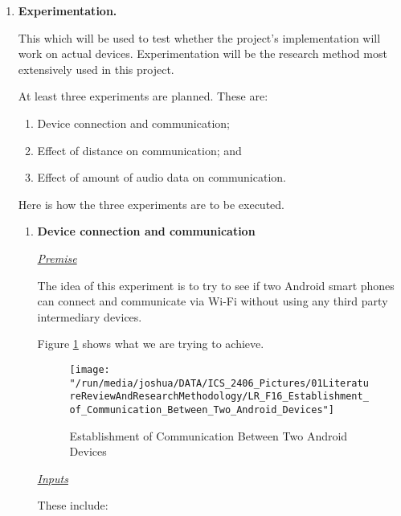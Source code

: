 \documentclass[12pt,svgnames,smaller]{article} %
\begin{document}
	\begin{enumerate}
		
		\item \textbf{Experimentation.}
		
		This which will be used to test whether the project’s implementation will work on actual devices. Experimentation will be the research method most extensively used in this project.
		
		At least three experiments are planned. These are:
		
		\begin{enumerate}
			\item Device connection and communication;
			\item Effect of distance on communication; and
			\item Effect of amount of audio data on communication.
		\end{enumerate}
		
		Here is how the three experiments are to be executed.
		
		\begin{enumerate}
			\item \textbf{Device connection and communication}
			
			\emph{\underline{\textsf{Premise}}}
			
			The idea of this experiment is to try to see if two Android smart phones can connect and communicate via Wi-Fi without using any third party intermediary devices.
			
			Figure \ref{fig:LiteratureReview-Figure16} shows what we are trying to achieve.
			
			\begin{figure}
				\centering
				\texttt{[image: "/run/media/joshua/DATA/ICS\_2406\_Pictures/01LiteratureReviewAndResearchMethodology/LR\_F16\_Establishment\_of\_Communication\_Between\_Two\_Android\_Devices"]}
				\caption{Establishment of Communication Between Two Android Devices}
				\label{fig:LiteratureReview-Figure16}
			\end{figure}
			
			\textsf{\underline{\emph{Inputs}}}
			
			These include:
			

\end{enumerate}
\end{enumerate}
\end{document}
